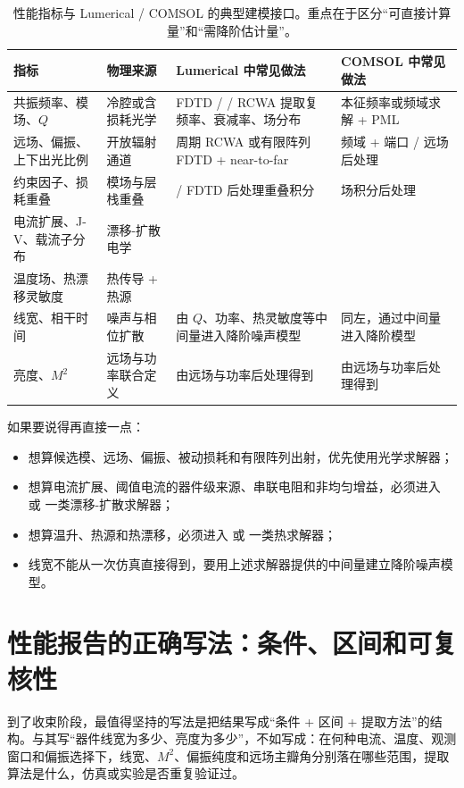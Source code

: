 \begin{table}[htbp]
  \centering
  \footnotesize
  \caption{性能指标与 Lumerical / COMSOL 的典型建模接口。重点在于区分“可直接计算量”和“需降阶估计量”。}
  \label{tab:metric_toolmap}
  \setlength{\tabcolsep}{4pt}
  \begin{tabularx}{\textwidth}{@{}p{1.8cm}p{2.1cm}Y Y@{}}
    \toprule
    指标 & 物理来源 & Lumerical 中常见做法 & COMSOL 中常见做法 \\
    \midrule
    共振频率、模场、$Q$ & 冷腔或含损耗光学 & FDTD /  / RCWA 提取复频率、衰减率、场分布 &  本征频率或频域求解 + PML \\
    远场、偏振、上下出光比例 & 开放辐射通道 & 周期 RCWA 或有限阵列 FDTD + near-to-far &  频域 + 端口 / 远场后处理 \\
    约束因子、损耗重叠 & 模场与层栈重叠 &  / FDTD 后处理重叠积分 &  场积分后处理 \\
    电流扩展、J-V、载流子分布 & 漂移-扩散电学 &  &  \\
    温度场、热漂移灵敏度 & 热传导 + 热源 &  &  \\
    线宽、相干时间 & 噪声与相位扩散 & 由 $Q$、功率、热灵敏度等中间量进入降阶噪声模型 & 同左，通过中间量进入降阶模型 \\
    亮度、$M^2$ & 远场与功率联合定义 & 由远场与功率后处理得到 & 由远场与功率后处理得到 \\
    \bottomrule
  \end{tabularx}
\end{table}

如果要说得再直接一点：
\begin{itemize}
  \item 想算候选模、远场、偏振、被动损耗和有限阵列出射，优先使用光学求解器；
  \item 想算电流扩展、阈值电流的器件级来源、串联电阻和非均匀增益，必须进入  或  一类漂移-扩散求解器；
  \item 想算温升、热源和热漂移，必须进入  或  一类热求解器；
  \item 线宽不能从一次仿真直接得到，要用上述求解器提供的中间量建立降阶噪声模型。
\end{itemize}

\section{性能报告的正确写法：条件、区间和可复核性}
到了收束阶段，最值得坚持的写法是把结果写成“条件 + 区间 + 提取方法”的结构。与其写“器件线宽为多少、亮度为多少”，不如写成：在何种电流、温度、观测窗口和偏振选择下，线宽、$M^2$、偏振纯度和远场主瓣角分别落在哪些范围，提取算法是什么，仿真或实验是否重复验证过。

